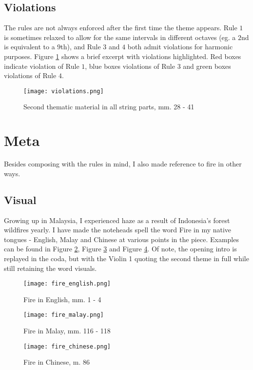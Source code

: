 \documentclass[12pt]{article}
\begin{document}
\subsection{Violations}
The rules are not always enforced after the first time the theme appears. Rule $1$ is sometimes relaxed to allow for the same intervals in different octaves (eg. a $2$nd is equivalent to a $9$th), and Rule $3$ and $4$ both admit violations for harmonic purposes. Figure \ref{second_theme} shows a brief excerpt with violations highlighted. Red boxes indicate violation of Rule $1$, blue boxes violations of Rule $3$ and green boxes violations of Rule $4$.

\begin{figure}[h!]
\centerline{\texttt{[image: violations.png]}}
\caption{Second thematic material in all string parts, mm. 28 - 41}
\label{second_theme}
\end{figure}

\pagebreak
\section{Meta}
Besides composing with the rules in mind, I also made reference to fire in other ways.
\subsection{Visual}
Growing up in Malaysia, I experienced haze as a result of Indonesia's forest wildfires yearly. I have made the noteheads spell the word Fire in my native tongues - English, Malay and Chinese at various points in the piece. Examples can be found in Figure \ref{fire_english}, Figure \ref{fire_malay} and Figure \ref{fire_chinese}. Of note, the opening intro is replayed in the coda, but with the Violin 1 quoting the second theme in full while still retaining the word visuals.

\begin{figure}[h!]
\centerline{\texttt{[image: fire\_english.png]}}
\caption{Fire in English, mm. 1 - 4}
\label{fire_english}
\end{figure}

\begin{figure}[h!]
\centerline{\texttt{[image: fire\_malay.png]}}
\caption{Fire in Malay, mm. 116 - 118}
\label{fire_malay}
\end{figure}

\begin{figure}[h!]
\centerline{\texttt{[image: fire\_chinese.png]}}
\caption{Fire in Chinese,  m. 86}
\label{fire_chinese}
\end{figure}
\end{document}
